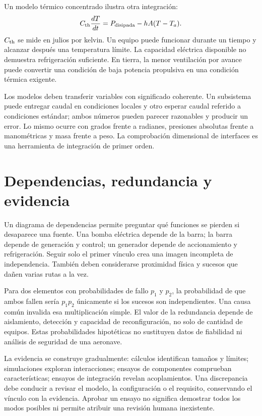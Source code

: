 Un modelo térmico concentrado ilustra otra integración:
\begin{equation}
 C_{\rm th}\frac{dT}{dt}=P_{\rm disipada}-hA(T-T_a).
\end{equation}
$C_{\rm th}$ se mide en julios por kelvin. Un equipo puede funcionar durante un tiempo y alcanzar después una temperatura límite. La capacidad eléctrica disponible no demuestra refrigeración suficiente. En tierra, la menor ventilación por avance puede convertir una condición de baja potencia propulsiva en una condición térmica exigente.

Los modelos deben transferir variables con significado coherente. Un subsistema puede entregar caudal en condiciones locales y otro esperar caudal referido a condiciones estándar; ambos números pueden parecer razonables y producir un error. Lo mismo ocurre con grados frente a radianes, presiones absolutas frente a manométricas y masa frente a peso. La comprobación dimensional de interfaces es una herramienta de integración de primer orden.

\section{Dependencias, redundancia y evidencia}
Un diagrama de dependencias permite preguntar qué funciones se pierden si desaparece una fuente. Una bomba eléctrica depende de la barra; la barra depende de generación y control; un generador depende de accionamiento y refrigeración. Seguir solo el primer vínculo crea una imagen incompleta de independencia. También deben considerarse proximidad física y sucesos que dañen varias rutas a la vez.

Para dos elementos con probabilidades de fallo $p_1$ y $p_2$, la probabilidad de que ambos fallen sería $p_1p_2$ únicamente si los sucesos son independientes. Una causa común invalida esa multiplicación simple. El valor de la redundancia depende de aislamiento, detección y capacidad de reconfiguración, no solo de cantidad de equipos. Estas probabilidades hipotéticas no sustituyen datos de fiabilidad ni análisis de seguridad de una aeronave.

La evidencia se construye gradualmente: cálculos identifican tamaños y límites; simulaciones exploran interacciones; ensayos de componentes comprueban características; ensayos de integración revelan acoplamientos. Una discrepancia debe conducir a revisar el modelo, la configuración o el requisito, conservando el vínculo con la evidencia. Aprobar un ensayo no significa demostrar todos los modos posibles ni permite atribuir una revisión humana inexistente.

